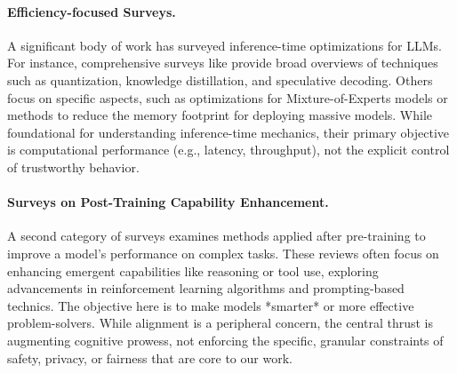 \paragraph{Efficiency-focused Surveys.}
A significant body of work has surveyed inference-time optimizations for LLMs. For instance, comprehensive surveys like\citep{survey:inference_efficiency1} provide broad overviews of techniques such as quantization, knowledge distillation, and speculative decoding. Others focus on specific aspects, such as optimizations for Mixture-of-Experts models\citep{survey:inference_moe} or methods to reduce the memory footprint for deploying massive models\citep{survey:inference_efficiency2}. While foundational for understanding inference-time mechanics, their primary objective is computational performance (e.g., latency, throughput), not the explicit control of trustworthy behavior.


\paragraph{Surveys on Post-Training Capability Enhancement.}
A second category of surveys examines methods applied after pre-training to improve a model's performance on complex tasks. These reviews often focus on enhancing emergent capabilities like reasoning or tool use, exploring advancements in reinforcement learning algorithms and prompting-based technics\citep{survey:post-training1, survey:post-training2}. The objective here is to make models *smarter* or more effective problem-solvers. While alignment is a peripheral concern, the central thrust is augmenting cognitive prowess, not enforcing the specific, granular constraints of safety, privacy, or fairness that are core to our work.



